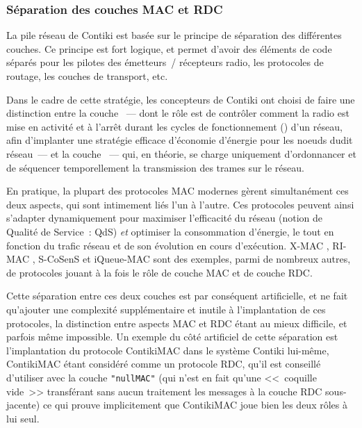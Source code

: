 \subsubsection{Séparation des couches MAC et RDC}
\label{ParContikiMACRDC}

La pile réseau de Contiki est basée sur le principe de séparation des
différentes couches. Ce principe est fort logique, et permet d'avoir
des éléments de code séparés pour les pilotes des émetteurs~/ récepteurs
radio, les protocoles de routage, les couches de transport, etc.

Dans le cadre de cette stratégie, les concepteurs de Contiki ont choisi
de faire une distinction entre la couche ~--- dont le rôle est de contrôler comment la radio est mise
en activité et à l'arrêt durant les cycles de fonctionnement () d'un réseau, afin d'implanter une stratégie efficace d'économie
d'énergie pour les noeuds dudit réseau~--- et la couche ~--- qui, en théorie, se charge uniquement
d'ordonnancer et de séquencer temporellement la transmission des trames
sur le réseau.

En pratique, la plupart des protocoles MAC modernes gèrent simultanément
ces deux aspects, qui sont intimement liés l'un à l'autre. Ces protocoles
peuvent ainsi s'adapter dynamiquement pour maximiser l'efficacité du
réseau (notion de Qualité de Service~: QdS) \emph{et} optimiser
la consommation d'énergie, le tout en fonction du trafic réseau et
de son évolution en cours d'exécution. X-MAC \cite{XMAC}, RI-MAC
\cite{RIMAC}, S-CoSenS \cite{CosensJournal} et iQueue-MAC \cite{iQueueMAC}
sont des exemples, parmi de nombreux autres, de protocoles jouant à la fois
le rôle de couche MAC et de couche RDC.

Cette séparation entre ces deux couches est par conséquent artificielle,
et ne fait qu'ajouter une complexité supplémentaire et inutile à
l'implantation de ces protocoles, la distinction entre aspects MAC
et RDC étant au mieux difficile, et parfois même impossible. Un exemple
du côté artificiel de cette séparation est l'implantation du protocole
ContikiMAC dans le système Contiki lui-même, ContikiMAC étant considéré
comme un protocole RDC, qu'il est conseillé d'utiliser avec la couche
\texttt{"nullMAC"} (qui n'est en fait qu'une <<~coquille vide~>> transférant
sans aucun traitement les messages à la couche RDC sous-jacente) ce qui
prouve implicitement que ContikiMAC joue bien les deux rôles à lui seul.

